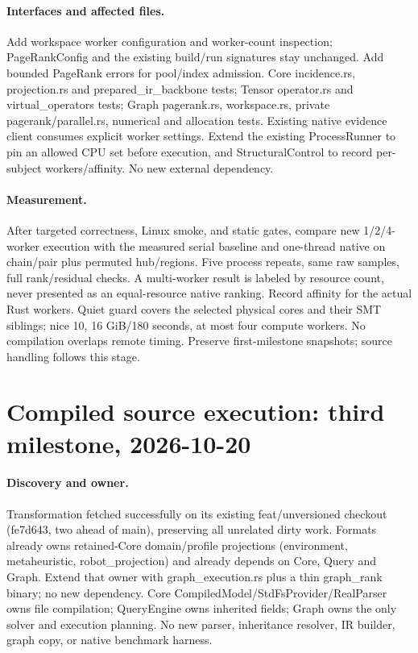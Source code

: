 \documentclass[11pt,a4paper]{article}
\begin{document}
\paragraph{Interfaces and affected files.} Add workspace worker configuration and
worker-count inspection; PageRankConfig and the existing build/run signatures stay
unchanged. Add bounded PageRank errors for pool/index admission. Core incidence.rs,
projection.rs and prepared\_ir\_backbone tests; Tensor operator.rs and virtual\_operators
 tests; Graph pagerank.rs, workspace.rs, private pagerank/parallel.rs, numerical and
allocation tests. Existing native evidence client consumes explicit worker settings.
Extend the existing ProcessRunner to pin an allowed CPU set before execution, and
StructuralControl to record per-subject workers/affinity. No new external dependency.
\paragraph{Measurement.} After targeted correctness, Linux smoke, and static gates,
compare new 1/2/4-worker execution with the measured serial baseline and one-thread
native on chain/pair plus permuted hub/regions. Five process repeats, same raw samples,
full rank/residual checks. A multi-worker result is labeled by resource count, never
presented as an equal-resource native ranking. Record affinity for the actual Rust
workers. Quiet guard covers the selected physical cores and their SMT siblings;
nice 10, 16 GiB/180 seconds, at most four compute workers. No compilation overlaps
remote timing. Preserve first-milestone snapshots; source handling follows this stage.
\clearpage\section*{Compiled source execution: third milestone, 2026-10-20}
\paragraph{Discovery and owner.} Transformation fetched successfully on its existing
feat/unversioned checkout (fe7d643, two ahead of main), preserving all unrelated dirty
work. Formats already owns retained-Core domain/profile projections (environment,
metaheuristic, robot\_projection) and already depends on Core, Query and Graph. Extend
that owner with graph\_execution.rs plus a thin graph\_rank binary; no new dependency.
Core CompiledModel/StdFsProvider/RealParser owns file compilation; QueryEngine owns
inherited fields; Graph owns the only solver and execution planning. No new parser,
inheritance resolver, IR builder, graph copy, or native benchmark harness.
\end{document}
